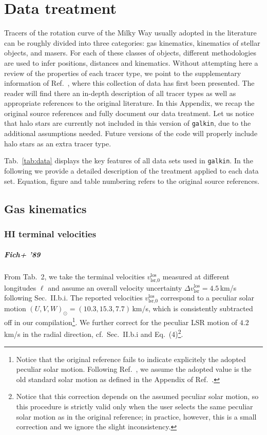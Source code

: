 \documentclass[twocolumn,prd,reprint,preprintnumbers,amsmath,amssymb,superscriptaddress,nofootinbib]{revtex4}
\begin{document}
\section{Data treatment}
\par Tracers of the rotation curve of the Milky Way usually adopted in the literature can be roughly divided into three categories: gas kinematics, kinematics of stellar objects, and masers. For each of these classes of objects, different methodologies are used to infer positions, distances and kinematics. Without attempting here a review of the properties of each tracer type, we point to the supplementary information of Ref.~\cite{2015NatPh..11..245I}, where this collection of data has first been presented. The reader will find there an in-depth description of all tracer types as well as appropriate references to the original literature. In this Appendix, we recap the original source references and fully document our data treatment. Let us notice that halo stars are currently not included in this version of \texttt{galkin}, due to the additional assumptions needed. Future versions of the code will properly include halo stars as an extra tracer type.

\par Tab.~\ref{tab:data} displays the key features of all data sets used in \texttt{galkin}. In the following we provide a detailed description of the treatment applied to each data set. Equation, figure and table numbering refers to the original source references.





\subsection{Gas kinematics}


\subsubsection{HI terminal velocities}

\subparagraph{Fich+ '89 \cite{Fich1989}} From Tab.~2, we take the terminal velocities $v_{\textrm{lsr,0}}^{\textrm{los}}$ measured at different longitudes $\ell$ and assume an overall velocity uncertainty $\Delta v_{\textrm{lsr}}^{\textrm{los}}=4.5\,$km/s following Sec.~II.b.i. The reported velocities $v_{\textrm{lsr,0}}^{\textrm{los}}$ correspond to a peculiar solar motion $(U,V,W)_{\odot}=(10.3,15.3,7.7)\,$km/s, which is consistently subtracted off in our compilation\footnote{\label{LSRfootnote} Notice that the original reference fails to indicate explicitely the adopted peculiar solar motion. Following Ref.~\cite{Reid2009}, we assume the adopted value is the old standard solar motion as defined in the Appendix of Ref.~\cite{Reid2009}.}. We further correct for the peculiar LSR motion of $4.2\,$km/s in the radial direction, cf.~Sec.~II.b.i and Eq.~(4)\footnote{\label{correctionfootnote} Notice that this correction depends on the assumed peculiar solar motion, so this procedure is strictly valid only when the user selects the same peculiar solar motion as in the original reference; in practice, however, this is a small correction and we ignore the slight inconsistency.}.
\end{document}
